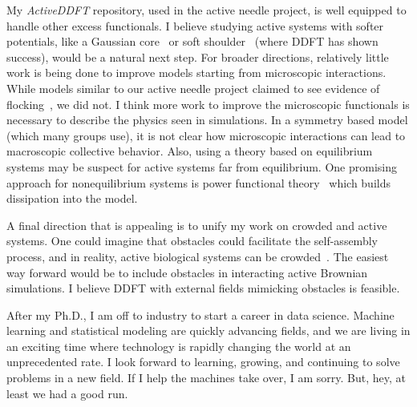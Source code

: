 My \textit{ActiveDDFT} repository, used in the active needle project, is well
equipped to handle other excess functionals. I believe studying active systems
with softer potentials, like a Gaussian core~\cite{lang_fluid_00,
dzubiella_meanfield_03} or soft shoulder~\cite{archer_quasicrystalline_13,
archer_softcore_15} (where DDFT has shown success), would be a natural next
step. For broader directions, relatively little work is being done to improve
models starting from microscopic interactions.  While models similar to our
active needle project claimed to see evidence of
flocking~\cite{baskaran_hydrodynamics_08}, we did not.  I think more work to
improve the microscopic functionals is necessary to describe the physics seen in
simulations. In a symmetry based model (which many groups use), it is not clear
how microscopic interactions can lead to macroscopic collective behavior. Also,
using a theory based on equilibrium systems may be suspect for active systems
far from equilibrium. One promising approach for nonequilibrium systems is
power functional theory~\cite{schmidt_power_13} which builds dissipation into
the model.

A final direction that is appealing is to unify my work on crowded and active
systems. One could imagine that obstacles could facilitate the self-assembly
process, and in reality, active biological systems can be
crowded~\cite{hofling_anomalous_13}.  The easiest way forward would be to
include obstacles in interacting active Brownian simulations. I
believe DDFT with external fields mimicking obstacles is feasible. 

After my Ph.D., I am off to industry to start a career in data science.  Machine
learning and statistical modeling are quickly advancing fields, and we are
living in an exciting time where technology is rapidly changing the world at an
unprecedented rate. I look forward to learning, growing, and continuing to solve
problems in a new field. If I help the machines take over, I am sorry.  But,
hey, at least we had a good run.

